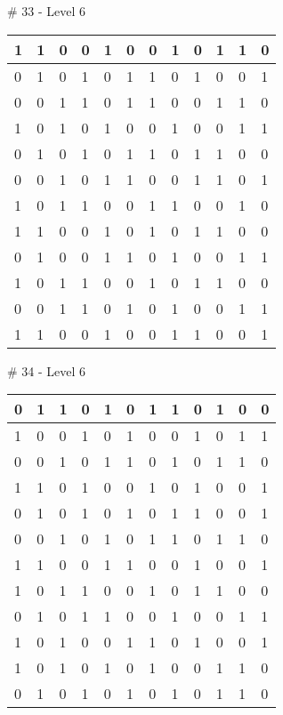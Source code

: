 \# 33 - Level 6 \newline
\begin{tabular}{|m{\collen}|m{\collen}|m{\collen}|m{\collen}|m{\collen}|m{\collen}|m{\collen}|m{\collen}|m{\collen}|m{\collen}|m{\collen}|m{\collen}|}
\hline
  1 & 1 & 0 & 0 & 1 & 0 & 0 & 1 & 0 & 1 & 1 & 0 \\
\hline
  0 & 1 & 0 & 1 & 0 & 1 & 1 & 0 & 1 & 0 & 0 & 1 \\
\hline
  0 & 0 & 1 & 1 & 0 & 1 & 1 & 0 & 0 & 1 & 1 & 0 \\
\hline
  1 & 0 & 1 & 0 & 1 & 0 & 0 & 1 & 0 & 0 & 1 & 1 \\
\hline
  0 & 1 & 0 & 1 & 0 & 1 & 1 & 0 & 1 & 1 & 0 & 0 \\
\hline
  0 & 0 & 1 & 0 & 1 & 1 & 0 & 0 & 1 & 1 & 0 & 1 \\
\hline
  1 & 0 & 1 & 1 & 0 & 0 & 1 & 1 & 0 & 0 & 1 & 0 \\
\hline
  1 & 1 & 0 & 0 & 1 & 0 & 1 & 0 & 1 & 1 & 0 & 0 \\
\hline
  0 & 1 & 0 & 0 & 1 & 1 & 0 & 1 & 0 & 0 & 1 & 1 \\
\hline
  1 & 0 & 1 & 1 & 0 & 0 & 1 & 0 & 1 & 1 & 0 & 0 \\
\hline
  0 & 0 & 1 & 1 & 0 & 1 & 0 & 1 & 0 & 0 & 1 & 1 \\
\hline
  1 & 1 & 0 & 0 & 1 & 0 & 0 & 1 & 1 & 0 & 0 & 1 \\
\hline
\end{tabular}


\smallskip

\# 34 - Level 6 \newline
\begin{tabular}{|m{\collen}|m{\collen}|m{\collen}|m{\collen}|m{\collen}|m{\collen}|m{\collen}|m{\collen}|m{\collen}|m{\collen}|m{\collen}|m{\collen}|}
\hline
  0 & 1 & 1 & 0 & 1 & 0 & 1 & 1 & 0 & 1 & 0 & 0 \\
\hline
  1 & 0 & 0 & 1 & 0 & 1 & 0 & 0 & 1 & 0 & 1 & 1 \\
\hline
  0 & 0 & 1 & 0 & 1 & 1 & 0 & 1 & 0 & 1 & 1 & 0 \\
\hline
  1 & 1 & 0 & 1 & 0 & 0 & 1 & 0 & 1 & 0 & 0 & 1 \\
\hline
  0 & 1 & 0 & 1 & 0 & 1 & 0 & 1 & 1 & 0 & 0 & 1 \\
\hline
  0 & 0 & 1 & 0 & 1 & 0 & 1 & 1 & 0 & 1 & 1 & 0 \\
\hline
  1 & 1 & 0 & 0 & 1 & 1 & 0 & 0 & 1 & 0 & 0 & 1 \\
\hline
  1 & 0 & 1 & 1 & 0 & 0 & 1 & 0 & 1 & 1 & 0 & 0 \\
\hline
  0 & 1 & 0 & 1 & 1 & 0 & 0 & 1 & 0 & 0 & 1 & 1 \\
\hline
  1 & 0 & 1 & 0 & 0 & 1 & 1 & 0 & 1 & 0 & 0 & 1 \\
\hline
  1 & 0 & 1 & 0 & 1 & 0 & 1 & 0 & 0 & 1 & 1 & 0 \\
\hline
  0 & 1 & 0 & 1 & 0 & 1 & 0 & 1 & 0 & 1 & 1 & 0 \\
\hline
\end{tabular}



